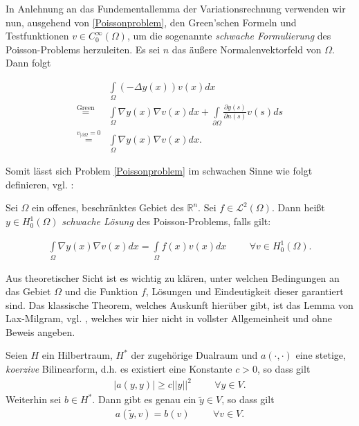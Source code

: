 In Anlehnung an das Fundementallemma der Variationsrechnung verwenden wir nun, ausgehend von \ref{Poissonproblem}, den Green'schen Formeln und Testfunktionen $v\in C_0^\infty(\Omega)$, um die sogenannte \textit{schwache Formulierung} des Poisson-Problems herzuleiten. Es sei $n$ das äußere Normalenvektorfeld von $\Omega$. Dann folgt

\begin{align*}
	& \underset{\Omega}{\int}(-\Delta y(x))v(x)dx  \\
	\overset{ \text{Green}}{=} & \underset{\Omega}{\int} \nabla y(x) \nabla v(x)dx 
	+ \underset{\partial\Omega}{\int}\frac{\partial y(s)}{\partial n(s)} v(s)ds \\
	\overset{v_{\vert\partial\Omega}=0}{=} & \underset{\Omega}{\int} \nabla y(x) \nabla v(x)dx .
\end{align*}

Somit lässt sich Problem \ref{Poissonproblem} im schwachen Sinne wie folgt definieren, vgl. \cite{PDE3}:

\begin{defi}
Sei $\Omega$ ein offenes, beschränktes Gebiet des $\mathbb{R}^n$. Sei $f\in \mathcal{L}^2(\Omega)$. Dann heißt $y\in H_0^1(\Omega)$ \textit{schwache Lösung} des Poisson-Problems, falls gilt:

\begin{align}\label{schw. Poi}
\underset{\Omega}{\int} \nabla y(x) \nabla v(x)dx  = \underset{\Omega}{\int} f(x)v(x)dx \hspace{1cm}\forall v\in H_0^1(\Omega).
\end{align}
\end{defi}

Aus theoretischer Sicht ist es wichtig zu klären, unter welchen Bedingungen an das Gebiet $\Omega$ und die Funktion $f$, Lösungen und Eindeutigkeit dieser garantiert sind. Das klassische Theorem, welches Auskunft hierüber gibt, ist das Lemma von Lax-Milgram, vgl. \cite{PDE3}, welches wir hier nicht in vollster Allgemeinheit und ohne Beweis angeben.

\begin{theorem}
Seien $H$ ein Hilbertraum, $H^*$ der zugehörige Dualraum und $a(\cdot, \cdot)$ eine stetige, \textit{koerzive} Bilinearform, d.h. es existiert eine Konstante $c > 0$, so dass gilt
\begin{align*}
	\vert a(y,y) \vert \geq c\vert\vert y \vert\vert^2 \hspace{1cm} \forall y \in V.
\end{align*}
Weiterhin sei $b\in H^*$. Dann gibt es genau ein $\tilde{y} \in V$, so dass gilt
\begin{align*}
a(\tilde{y},v) = b(v) \hspace{1cm} \forall v \in V.
\end{align*}
\end{theorem}

